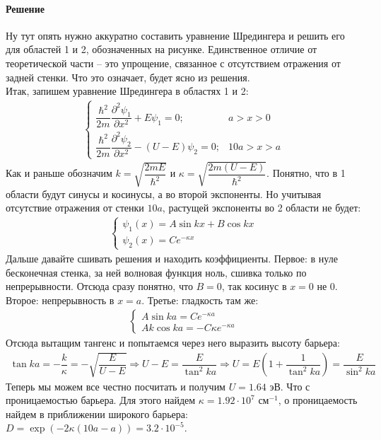 \documentclass[12pt]{article}
\begin{document}
\paragraph{Решение}
Ну тут опять нужно аккуратно составить уравнение Шредингера и решить его для областей 1 и 2, обозначенных на рисунке. Единственное отличие от теоретической части -- это упрощение, связанное с отсутствием отражения от задней стенки. Что это означает, будет ясно из решения. 
\\ 
Итак, запишем уравнение Шредингера в областях 1 и 2:
\begin{gather*}
    \begin{cases}
         \dfrac{\hbar^2}{2m}\dfrac{\partial^2\psi_1}{\partial x^2} +  E\psi_1=0; &a>x>0  \\[10pt]
         \dfrac{\hbar^2}{2m}\dfrac{\partial^2\psi_2}{\partial x^2} - (U - E)\psi_2=0; & 10a>x>a
    \end{cases}
\end{gather*}
Как и раньше обозначим $k = \sqrt{\dfrac{2mE}{\hbar^2}}$ и $ \kappa = \sqrt{\dfrac{2m(U -E)}{\hbar^2}}$. Понятно, что в 1 области будут синусы и косинусы, а во второй экспоненты. Но учитывая отсутствие отражения от стенки $10a$, растущей экспоненты во 2 области не будет:
\begin{gather*}
    \begin{cases}
         \psi_1(x) = A \sin{kx} + B \cos{kx}\\
         \psi_2(x) = Ce^{-\kappa x} 
    \end{cases}
\end{gather*}
Дальше давайте сшивать решения и находить коэффициенты. Первое: в нуле бесконечная стенка, за ней волновая функция ноль, сшивка только по непрерывности. Отсюда сразу понятно, что $B=0$, так косинус в $x=0$ не 0. Второе: непрерывность в $x=a$. Третье: гладкость там же:
\begin{gather*}
    \begin{cases}
         A \sin{ka} = Ce^{-\kappa a} \\
         Ak \cos{ka} = -C\kappa e^{-\kappa a}
    \end{cases}
\end{gather*}
Отсюда вытащим тангенс и попытаемся через него выразить высоту барьера:
\begin{gather*}
    \tan{ka} = -\dfrac{k}{\kappa}= - \sqrt{\dfrac{E}{U-E}} \Rightarrow U-E = \dfrac{E}{\tan^2{ka}} \Rightarrow U = E(1 + \dfrac{1}{\tan^2{ka}}) = \dfrac{E}{\sin^2{ka}}
\end{gather*}
Теперь мы можем все честно посчитать и получим $U = 1.64$ эВ. Что с проницаемостью барьера. Для этого найдем $\kappa =1.92\cdot 10^7 \text{ см}^{-1}$, о проницаемость найдем в приближении широкого барьера: $D = \exp{\left( -2\kappa(10a-a)\right)} = 3.2\cdot10^{-5}$.
\end{document}
